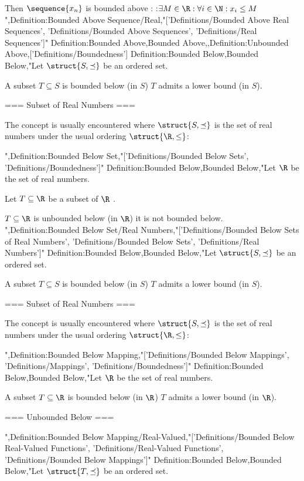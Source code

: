 Then $\sequence {x_n}$ is bounded above :
:$\exists M \in \R: \forall i \in \N: x_i \le M$",Definition:Bounded Above Sequence/Real,"['Definitions/Bounded Above Real Sequences', 'Definitions/Bounded Above Sequences', 'Definitions/Real Sequences']"
Definition:Bounded Above,Bounded Above,,Definition:Unbounded Above,['Definitions/Boundedness']
Definition:Bounded Below,Bounded Below,"Let $\struct {S, \preceq}$ be an ordered set.


A subset $T \subseteq S$ is bounded below (in $S$)  $T$ admits a lower bound (in $S$).


=== Subset of Real Numbers ===

The concept is usually encountered where $\struct {S, \preceq}$ is the set of real numbers under the usual ordering $\struct {\R, \le}$:

",Definition:Bounded Below Set,"['Definitions/Bounded Below Sets', 'Definitions/Boundedness']"
Definition:Bounded Below,Bounded Below,"Let $\R$ be the set of real numbers.

Let $T \subseteq \R$ be a subset of $\R$ .


$T \subseteq \R$ is unbounded below (in $\R$)  it is not bounded below.
",Definition:Bounded Below Set/Real Numbers,"['Definitions/Bounded Below Sets of Real Numbers', 'Definitions/Bounded Below Sets', 'Definitions/Real Numbers']"
Definition:Bounded Below,Bounded Below,"Let $\struct {S, \preceq}$ be an ordered set.


A subset $T \subseteq S$ is bounded below (in $S$)  $T$ admits a lower bound (in $S$).


=== Subset of Real Numbers ===

The concept is usually encountered where $\struct {S, \preceq}$ is the set of real numbers under the usual ordering $\struct {\R, \le}$:


",Definition:Bounded Below Mapping,"['Definitions/Bounded Below Mappings', 'Definitions/Mappings', 'Definitions/Boundedness']"
Definition:Bounded Below,Bounded Below,"Let $\R$ be the set of real numbers.

A subset $T \subseteq \R$ is bounded below (in $\R$)  $T$ admits a lower bound (in $\R$).


=== Unbounded Below ===

",Definition:Bounded Below Mapping/Real-Valued,"['Definitions/Bounded Below Real-Valued Functions', 'Definitions/Real-Valued Functions', 'Definitions/Bounded Below Mappings']"
Definition:Bounded Below,Bounded Below,"Let $\struct {T, \preceq}$ be an ordered set.

